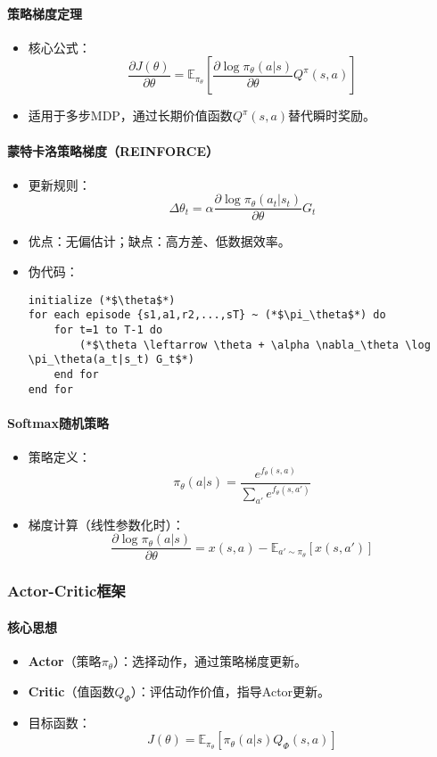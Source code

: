 \paragraph{策略梯度定理}
\begin{itemize}
    \item 核心公式：
    \[
    \frac{\partial J(\theta)}{\partial \theta} = \mathbb{E}_{\pi_\theta} \left[ \frac{\partial \log \pi_\theta(a|s)}{\partial \theta} Q^{\pi}(s,a) \right]
    \]
    \item 适用于多步MDP，通过长期价值函数$Q^{\pi}(s,a)$替代瞬时奖励。
\end{itemize}

\paragraph{蒙特卡洛策略梯度（REINFORCE）}
\begin{itemize}
    \item 更新规则：
    \[
    \Delta \theta_t = \alpha \frac{\partial \log \pi_\theta(a_t|s_t)}{\partial \theta} G_t
    \]
    \item 优点：无偏估计；缺点：高方差、低数据效率。
    \item 伪代码：
    \begin{lstlisting}
initialize (*$\theta$*)
for each episode {s1,a1,r2,...,sT} ~ (*$\pi_\theta$*) do
    for t=1 to T-1 do
        (*$\theta \leftarrow \theta + \alpha \nabla_\theta \log \pi_\theta(a_t|s_t) G_t$*)
    end for
end for
    \end{lstlisting}
\end{itemize}

\paragraph{Softmax随机策略}
\begin{itemize}
    \item 策略定义：
    \[
    \pi_\theta(a|s) = \frac{e^{f_\theta(s,a)}}{\sum_{a'} e^{f_\theta(s,a')}}
    \]
    \item 梯度计算（线性参数化时）：
    \[
    \frac{\partial \log \pi_\theta(a|s)}{\partial \theta} = x(s,a) - \mathbb{E}_{a' \sim \pi_\theta}[x(s,a')]
    \]
\end{itemize}

\subsubsection{Actor-Critic框架}
\paragraph{核心思想}
\begin{itemize}
    \item \textbf{Actor}（策略$\pi_\theta$）：选择动作，通过策略梯度更新。
    \item \textbf{Critic}（值函数$Q_\Phi$）：评估动作价值，指导Actor更新。
    \item 目标函数：
    \[
    J(\theta) = \mathbb{E}_{\pi_\theta} \left[ \pi_\theta(a|s) Q_\Phi(s,a) \right]
    \]
\end{itemize}

